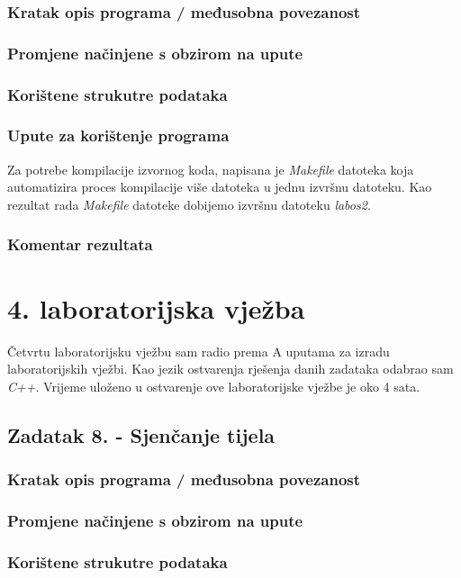 \documentclass{report}
\begin{document}
\subsection{Kratak opis programa / međusobna povezanost}
\subsection{Promjene načinjene s obzirom na upute}
\subsection{Korištene strukutre podataka}
\subsection{Upute za korištenje programa}
Za potrebe kompilacije izvornog koda, napisana je \textit{Makefile} datoteka koja automatizira proces kompilacije više datoteka u jednu izvršnu datoteku. Kao rezultat rada \textit{Makefile} datoteke dobijemo izvršnu datoteku \textit{labos2}.

\subsection{Komentar rezultata}

\chapter{4. laboratorijska vježba}
Četvrtu laboratorijsku vježbu sam radio prema A uputama za izradu laboratorijskih vježbi. Kao jezik ostvarenja rješenja danih zadataka odabrao sam \textit{C++}. Vrijeme uloženo u ostvarenje ove laboratorijske vježbe je oko 4 sata. 

\section{Zadatak 8. - Sjenčanje tijela}
\subsection{Kratak opis programa / međusobna povezanost}
\subsection{Promjene načinjene s obzirom na upute}
\subsection{Korištene strukutre podataka}
\end{document}
